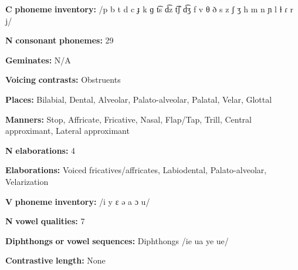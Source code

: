 \documentclass[output=paper]{langsci/langscibook}
\begin{document}
\begin{styleBody}
\textbf{C} \textbf{phoneme} \textbf{inventory:} /p b t d c ɟ k ɡ t͡s d͡z t͡ʃ d͡ʒ f v θ ð s z ʃ ʒ h m n ɲ l ɫ ɾ r j/
\end{styleBody}

\begin{styleBody}
\textbf{N} \textbf{consonant} \textbf{phonemes:} 29
\end{styleBody}

\begin{styleBody}
\textbf{Geminates:} N/A
\end{styleBody}

\begin{styleBody}
\textbf{Voicing} \textbf{contrasts:} Obstruents
\end{styleBody}

\begin{styleBody}
\textbf{Places:} Bilabial, Dental, Alveolar, Palato-alveolar, Palatal, Velar, Glottal
\end{styleBody}

\begin{styleBody}
\textbf{Manners:} Stop, Affricate, Fricative, Nasal, Flap/Tap, Trill, Central approximant, Lateral approximant
\end{styleBody}

\begin{styleBody}
\textbf{N} \textbf{elaborations:} 4
\end{styleBody}

\begin{styleBody}
\textbf{Elaborations:} Voiced fricatives/affricates, Labiodental, Palato-alveolar, Velarization
\end{styleBody}

\begin{styleBody}
\textbf{V} \textbf{phoneme} \textbf{inventory:} /i y ɛ ə a ɔ u/
\end{styleBody}

\begin{styleBody}
\textbf{N} \textbf{vowel} \textbf{qualities:} 7
\end{styleBody}

\begin{styleBody}
\textbf{Diphthongs} \textbf{or} \textbf{vowel} \textbf{sequences:} Diphthongs /ie ua ye ue/
\end{styleBody}

\begin{styleBody}
\textbf{Contrastive} \textbf{length:} None
\end{styleBody}
\end{document}
